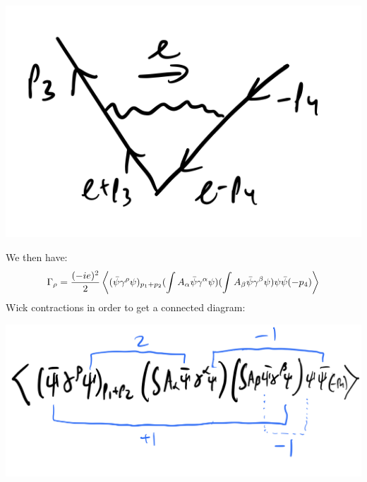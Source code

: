 \begin{center}
    \includegraphics[scale=0.35]{Lectures/Images/lec14-oneloopmomentazoom.png}
\end{center}

We then have:
\begin{equation}
    \Gamma_\rho = \frac{(-ie)^2}{2}\left< (\bar{\psi}\gamma^\rho\psi)_{p_1 + p_2}(\int A_\alpha \bar{\psi}\gamma^\alpha \psi)(\int A_\beta \bar{\psi}\gamma^\beta \psi)\psi \bar{\psi}(-p_4) \right>
\end{equation}
Wick contractions in order to get a connected diagram:

\begin{center}
    \includegraphics[scale=0.35]{Lectures/Images/lec14-pairings.png}
\end{center}


